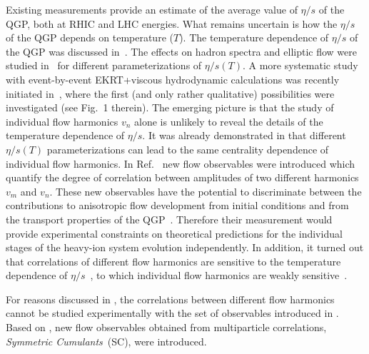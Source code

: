 Existing measurements provide an estimate of the average value of $\eta/s$ of the QGP, both at RHIC and LHC energies. What remains uncertain is how the $\eta/s$ of the QGP depends on temperature ($T$). The temperature dependence of $\eta/s$ of the QGP was discussed in~\cite{Csernai:2006zz}. The effects on hadron spectra and elliptic flow were studied in~\cite{Niemi:2011ix} for different parameterizations of $\eta/s(T)$.  A more systematic study with event-by-event EKRT+viscous hydrodynamic calculations was recently initiated in~\cite{Niemi:2015qia}, where the first (and only rather qualitative) possibilities were investigated (see Fig.~1 therein). The emerging picture is that the study of individual flow harmonics $v_n$ alone is unlikely to reveal the details of the temperature dependence of $\eta/s$.
It was already demonstrated in \cite{Niemi:2015qia} that different $\eta/s(T)$ parameterizations can lead to the same centrality dependence of individual flow harmonics. In Ref.~\cite{Niemi:2012aj} new flow observables were introduced which quantify the degree of correlation between amplitudes of two different harmonics $v_m$ and $v_n$. These new observables have the potential to discriminate between the contributions to anisotropic flow development from initial conditions and from the transport properties of the QGP~\cite{Niemi:2012aj}. Therefore their measurement would provide experimental constraints on theoretical predictions for the individual stages of the heavy-ion system evolution independently. In addition, it turned out that correlations of different flow harmonics are sensitive to the temperature dependence of $\eta/s$~\cite{ALICE:2016kpq}, to which individual flow harmonics are weakly sensitive~\cite{Niemi:2015qia}. 
 
For reasons discussed in \cite{ALICE:2016kpq,Bilandzic:2013kga}, the correlations between different flow harmonics cannot be studied experimentally with the set of observables introduced in \cite{Niemi:2012aj}. 
Based on \cite{Bilandzic:2013kga}, new flow observables obtained from multiparticle correlations, \textit{Symmetric Cumulants}~(SC), were introduced. 

